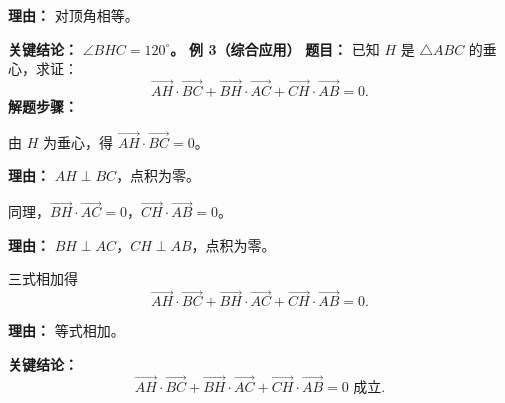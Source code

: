 \begin{examplebox}
\begin{description}[style=nextline, leftmargin=2.8em, labelsep=0.5em, itemsep=0.45em]
			\par\textbf{理由：} 对顶角相等。
	\end{description}
	\textbf{\textcolor{CExample}{关键结论：}}
	\textbf{$\angle BHC=120^\circ$。}
	\medskip
	\textbf{\textcolor{CExample}{例 3（综合应用）}}
	\textbf{\textcolor{CExample}{题目：}}
	已知 $H$ 是 $\triangle ABC$ 的垂心，求证：
	\[
		\overrightarrow{AH}\cdot\overrightarrow{BC}+\overrightarrow{BH}\cdot\overrightarrow{AC}+\overrightarrow{CH}\cdot\overrightarrow{AB}=0.
	\]
	\textbf{\textcolor{CExample}{解题步骤：}}
	\begin{description}[style=nextline, leftmargin=2.8em, labelsep=0.5em, itemsep=0.45em]
		\item[\textbf{第一步（单个垂直）：}] 由 $H$ 为垂心，得 $\overrightarrow{AH}\cdot\overrightarrow{BC}=0$。
			\par\textbf{理由：} $AH\perp BC$，点积为零。
		\item[\textbf{第二步（另外两个垂直）：}] 同理，$\overrightarrow{BH}\cdot\overrightarrow{AC}=0$，$\overrightarrow{CH}\cdot\overrightarrow{AB}=0$。
			\par\textbf{理由：} $BH\perp AC$，$CH\perp AB$，点积为零。
		\item[\textbf{第三步（求和得证）：}] 三式相加得
			\[
				\overrightarrow{AH}\cdot\overrightarrow{BC}+\overrightarrow{BH}\cdot\overrightarrow{AC}+\overrightarrow{CH}\cdot\overrightarrow{AB}=0.
			\]
			\par\textbf{理由：} 等式相加。
	\end{description}
	\textbf{\textcolor{CExample}{关键结论：}}
	\[
		\overrightarrow{AH}\cdot\overrightarrow{BC}+\overrightarrow{BH}\cdot\overrightarrow{AC}+\overrightarrow{CH}\cdot\overrightarrow{AB}=0 \text{ 成立.}
	\]
\end{examplebox}

